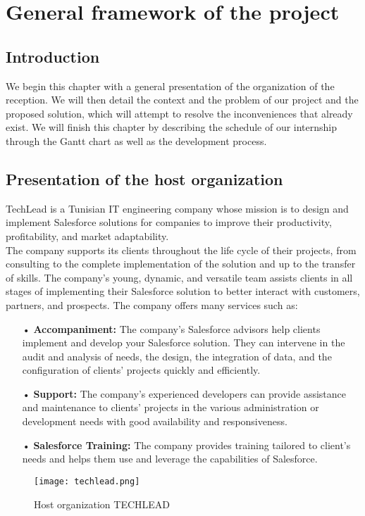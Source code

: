 

\chapter{General framework of the project}%


\section*{Introduction}
We begin this chapter with a general presentation of the organization
of the reception. We will then detail the context and the problem of our project and
the proposed solution, which will attempt to resolve the inconveniences
that already exist. We will finish this chapter by describing
the schedule of our internship through the Gantt chart as well as the
development process.\\

\section{Presentation of the host organization}
TechLead is a Tunisian IT engineering company whose mission is to design and implement Salesforce solutions for companies to improve their productivity, profitability, and market adaptability.\\
The company supports its clients throughout the life cycle of their projects, from consulting to the complete implementation of the solution and up to the transfer of skills. The company's young, dynamic, and versatile team assists clients in all stages of implementing their Salesforce solution to better interact with customers, partners, and prospects.
The company offers many services such as:
\begin{itemize}
\item[•] \textbf{Accompaniment:} The company's Salesforce advisors help clients implement and develop your Salesforce solution. They can intervene in the audit and analysis of needs, the design, the integration of data, and the configuration of clients' projects quickly and efficiently.
\item[•] \textbf{Support:} The company's experienced developers can provide assistance and maintenance to clients' projects in the various administration or development needs with good availability and responsiveness.
\item[•] \textbf{Salesforce Training:} The company provides training tailored to client's needs and helps them use and leverage the capabilities of Salesforce.
\end{itemize}
\begin{figure}[H]%
    \center   
    \texttt{[image: techlead.png]}
    \caption{Host organization TECHLEAD}
\end{figure}



